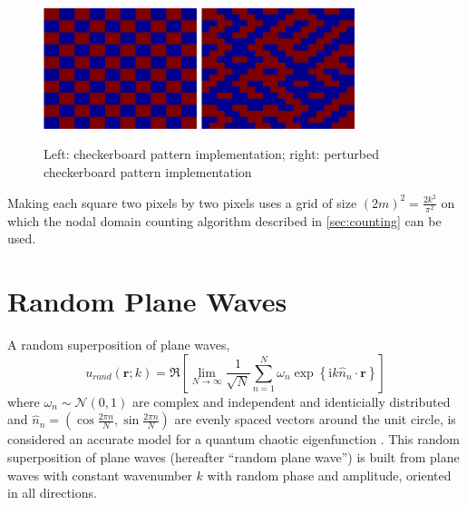 \documentclass{report}
\newcommand{\rr}[0]{\mathbf{r}}
\begin{document}
\begin{figure}
  \begin{center}
    \includegraphics[width=0.4\textwidth]{figs/percolation/checkerboard_implementation.eps}
    \hspace{1 cm}
    \includegraphics[width=0.4\textwidth]{figs/percolation/perturbed_implementation.eps}
    \caption{Left: checkerboard pattern implementation; right: perturbed checkerboard pattern implementation}
    \label{fig:percolation_implementation}
  \end{center}
\end{figure}

Making each square two pixels by two pixels uses a grid of size $(2m)^{2} = \frac{2 k^{2}}{\pi^2}$ on which the nodal domain counting algorithm described in \ref{sec:counting} can be used.

\section{Random Plane Waves}
A random superposition of plane waves,
\begin{equation}
  \label{eq:rpw}
  u_{rand}(\rr ; k) = \Re \left[ \lim_{N \rightarrow \infty} \frac{1}{\sqrt{N}} \sum_{n=1}^{N} \omega_{n} \exp{\left\{\mathrm{i} k \hat{n}_{n} \cdot \rr \right\}} \right]
\end{equation}
where $\omega_{n} \sim \mathcal{N}(0,1)$ are complex and independent and identicially distributed and $\hat{n}_{n} = (\cos \frac {2 \pi n}{N}, \sin \frac {2 \pi n}{N})$ are evenly spaced vectors around the unit circle, is considered an accurate model for a quantum chaotic eigenfunction \cite{heller}. This random superposition of plane waves (hereafter ``random plane wave'') is built from plane waves with constant wavenumber $k$ with random phase and amplitude, oriented in all directions.
\end{document}

